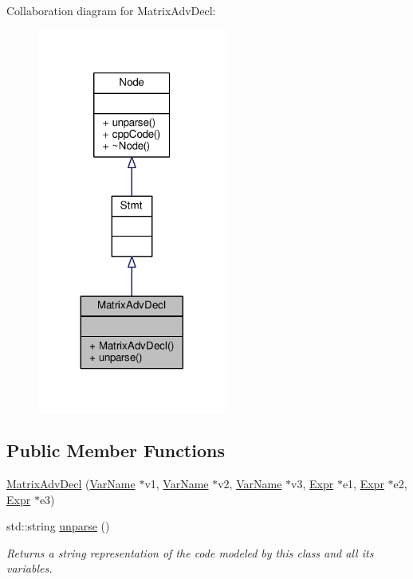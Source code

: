 Collaboration diagram for Matrix\-Adv\-Decl\-:\nopagebreak
\begin{figure}[H]
\begin{center}
\leavevmode
\includegraphics[width=176pt]{classMatrixAdvDecl__coll__graph}
\end{center}
\end{figure}
\subsection*{Public Member Functions}
\begin{DoxyCompactItemize}
\item 
\hyperlink{classMatrixAdvDecl_af91ad882300c22394ae4e203452985ce}{Matrix\-Adv\-Decl} (\hyperlink{classVarName}{Var\-Name} $\ast$v1, \hyperlink{classVarName}{Var\-Name} $\ast$v2, \hyperlink{classVarName}{Var\-Name} $\ast$v3, \hyperlink{classExpr}{Expr} $\ast$e1, \hyperlink{classExpr}{Expr} $\ast$e2, \hyperlink{classExpr}{Expr} $\ast$e3)
\item 
std\-::string \hyperlink{classMatrixAdvDecl_afa5f531b97e350e9a8c434bf5bdf1a0d}{unparse} ()
\begin{DoxyCompactList}\small\item\em Returns a string representation of the code modeled by this class and all its variables. \end{DoxyCompactList}\end{DoxyCompactItemize}


